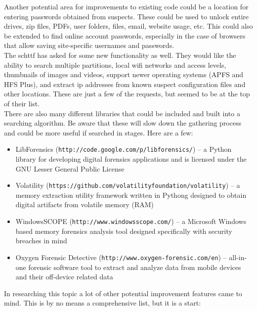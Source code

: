 \documentclass[12pt]{article}
\begin{document}
Another potential area for improvements to existing code could be a location for
entering passwords obtained from suspects.  These could be used to unlock entire
drives, zip files, PDFs, user folders, files, email, website usage, etc.  This
could also be extended to find online account passwords, especially in the case
of browsers that allow saving site-specific usernames and passwords.\\

The \gls{schttf} has asked for some new functionality as well.  They would like the
ability to search multiple partitions, local \gls{wifi} networks and access levels, 
thumbnails of images and videos, support newer operating systems (APFS and
HFS Plus), and extract \gls{ip} addresses from known suspect configuration files and 
other locations.  These are just a few of the requests, but seemed to be at
the top of their list.\\

There are also many different libraries that could be included and built
into a searching algorithm.  Be aware that these will slow down the gathering
process and could be more useful if searched in stages.  Here are a few:

\vspace{0.5 cm}
\begin{itemize}
  \item LibForensics ({\tt http://code.google.com/p/libforensics/}) --
  a Python library for developing digital forensics applications and
  is licensed under the GNU Lesser General Public License
  \item Volatility ({\tt https://github.com/volatilityfoundation/volatility}) --
  a memory extraction utility framework written in Pythong designed to
  obtain digital artifacts from volatile memory (RAM)
  \item WindowsSCOPE ({\tt http://www.windowsscope.com/}) -- 
  a Microsoft Windows\texttrademark\\
  based memory forensics analysis tool designed specifically with security breaches
  in mind
  \item Oxygen Forensic Detective ({\tt http://www.oxygen-forensic.com/en}) -- 
  all-in-one forensic software tool to extract and analyze data from mobile
  devices and their off-device related data
\end{itemize}
\vspace{0.5 cm}

In researching this topic a lot of other potential improvement features
came to mind.  This is by no means a comprehensive list, but it is a start:
\end{document}
